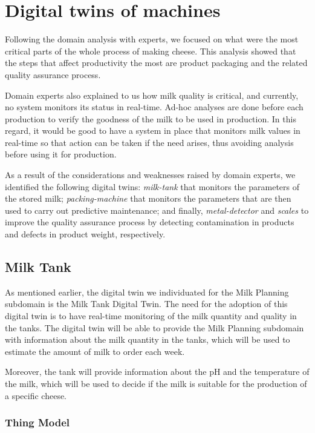 \section{Digital twins of machines}
Following the domain analysis with experts, we focused on what were the most critical parts of the whole process of making cheese.
This analysis showed that the steps that affect productivity the most are product packaging and the related quality assurance process.

Domain experts also explained to us how milk quality is critical, and currently, no system monitors its status in real-time.
Ad-hoc analyses are done before each production to verify the goodness of the milk to be used in production.
In this regard, it would be good to have a system in place that monitors milk values in real-time so that action can be taken if the need arises,
thus avoiding analysis before using it for production.


As a result of the considerations and weaknesses raised by domain experts, we identified the following digital twins:
\textit{milk-tank} that monitors the parameters of the stored milk; \textit{packing-machine} that monitors the parameters that are then used to carry
out predictive maintenance; and finally, \textit{metal-detector} and \textit{scales} to improve the quality assurance process by detecting contamination in products and defects in product weight, respectively.

\subsection{Milk Tank}
As mentioned earlier, the digital twin we individuated for the Milk Planning subdomain is the Milk Tank Digital Twin.
The need for the adoption of this digital twin is to have real-time monitoring of the milk quantity and quality in the tanks.
The digital twin will be able to provide the Milk Planning subdomain with information about the milk quantity in the tanks, which will be used to estimate the amount of milk to order each week.

Moreover, the tank will provide information about the pH and the temperature of the milk, which will be used to decide if the milk is suitable for the production of a specific cheese.


\subsubsection{Thing Model}

